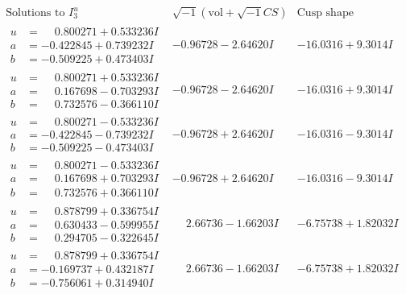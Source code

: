 \documentclass[1p]{elsarticle_modified}
\theoremstyle{definition}
\newcommand{\I}{\sqrt{-1}}
\begin{document}
$$\begin{array}{c|c|c}  
\text{Solutions to }I^u_{3}& \I (\text{vol} + \sqrt{-1}CS) & \text{Cusp shape}\\
 \hline 
\begin{aligned}
u &= \phantom{-}0.800271 + 0.533236 I \\
a &= -0.422845 + 0.739232 I \\
b &= -0.509225 + 0.473403 I\end{aligned}
 & -0.96728 - 2.64620 I & -16.0316 + 9.3014 I \\ \hline\begin{aligned}
u &= \phantom{-}0.800271 + 0.533236 I \\
a &= \phantom{-}0.167698 - 0.703293 I \\
b &= \phantom{-}0.732576 - 0.366110 I\end{aligned}
 & -0.96728 - 2.64620 I & -16.0316 + 9.3014 I \\ \hline\begin{aligned}
u &= \phantom{-}0.800271 - 0.533236 I \\
a &= -0.422845 - 0.739232 I \\
b &= -0.509225 - 0.473403 I\end{aligned}
 & -0.96728 + 2.64620 I & -16.0316 - 9.3014 I \\ \hline\begin{aligned}
u &= \phantom{-}0.800271 - 0.533236 I \\
a &= \phantom{-}0.167698 + 0.703293 I \\
b &= \phantom{-}0.732576 + 0.366110 I\end{aligned}
 & -0.96728 + 2.64620 I & -16.0316 - 9.3014 I \\ \hline\begin{aligned}
u &= \phantom{-}0.878799 + 0.336754 I \\
a &= \phantom{-}0.630433 - 0.599955 I \\
b &= \phantom{-}0.294705 - 0.322645 I\end{aligned}
 & \phantom{-}2.66736 - 1.66203 I & -6.75738 + 1.82032 I \\ \hline\begin{aligned}
u &= \phantom{-}0.878799 + 0.336754 I \\
a &= -0.169737 + 0.432187 I \\
b &= -0.756061 + 0.314940 I\end{aligned}
 & \phantom{-}2.66736 - 1.66203 I & -6.75738 + 1.82032 I \\ \hline\begin{aligned}

\end{aligned}
\end{array}$$
\end{document}
